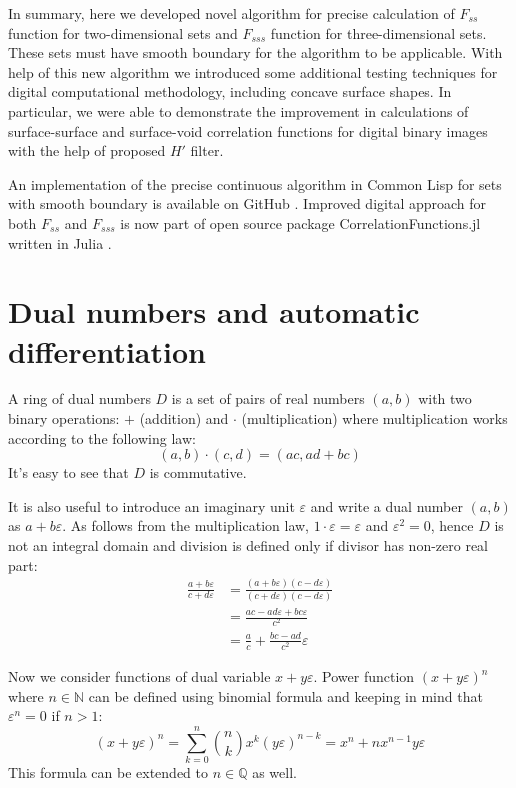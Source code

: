 \documentclass[preprint]{elsarticle}
\begin{document}
In summary, here we developed novel algorithm for precise calculation of
$F_{ss}$ function for two-dimensional sets and $F_{sss}$ function for
three-dimensional sets. These sets must have smooth boundary for the algorithm
to be applicable. With help of this new algorithm we introduced some additional
testing techniques for digital computational methodology, including concave
surface shapes.  In particular, we were able to demonstrate the improvement in
calculations of surface-surface and surface-void correlation functions for
digital binary images with the help of proposed $H'$ filter.

An implementation of the precise continuous algorithm in Common Lisp for sets
with smooth boundary is available on GitHub
\cite{diff-boundary-corrfn}. Improved digital approach for both $F_{ss}$ and
$F_{sss}$ is now part of open source package CorrelationFunctions.jl written in
Julia \cite{CFs.jl}.

\appendix
\section{Dual numbers and automatic differentiation}
\label{sec:dual}
A ring of dual numbers $D$ is a set of pairs of real numbers $(a, b)$ with two
binary operations: $+$ (addition) and $\cdot$ (multiplication) where
multiplication works according to the following law:
\begin{equation}
  (a, b)\cdot(c, d) = (ac, ad + bc)
\end{equation}
It's easy to see that $D$ is commutative.

It is also useful to introduce an imaginary unit $\varepsilon$ and write a dual
number $(a, b)$ as $a + b\varepsilon$. As follows from the multiplication law,
$1\cdot \varepsilon = \varepsilon$ and $\varepsilon^2 = 0$, hence $D$ is not an
integral domain and division is defined only if divisor has non-zero real part:
\begin{equation}
  \begin{aligned}
    \frac{a+b\varepsilon}{c+d\varepsilon} &=
    \frac{(a+b\varepsilon)(c-d\varepsilon)}{(c+d\varepsilon)(c-d\varepsilon)} \\
    &= \frac{ac-ad\varepsilon+bc\varepsilon}{c^2} \\
    &= \frac{a}{c} + \frac{bc-ad}{c^2}\varepsilon
  \end{aligned}
\end{equation}

Now we consider functions of dual variable $x + y\varepsilon$. Power function
$(x + y\varepsilon)^n$ where $n \in \mathbb{N}$ can be defined using binomial
formula and keeping in mind that $\varepsilon^n = 0$ if $n>1$:
\begin{equation}
  (x + y\varepsilon)^n = \sum_{k=0}^n \binom{n}{k} x^k (y\varepsilon)^{n-k} =
  x^n + n x^{n-1} y \varepsilon
\end{equation}
This formula can be extended to $n \in \mathbb{Q}$ as well.
\end{document}
